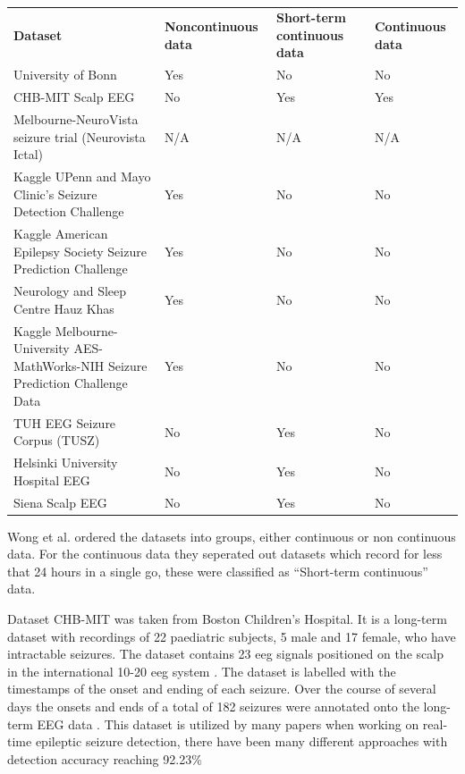 \documentclass[12pt]{article}
\begin{document}
\begin{table}[H]
\centering
\begin{tabular}{p{}p{}p{}p{}}
  \textbf{Dataset} &
  \textbf{Noncontinuous data} &
  \textbf{Short-term continuous data} &
  \textbf{Continuous data} \\
  
University of Bonn                                                              & Yes & No  & No  \\
CHB-MIT Scalp EEG                                                               & No  & Yes & Yes \\
Melbourne-NeuroVista seizure trial (Neurovista Ictal)                           & N/A & N/A & N/A \\
Kaggle UPenn and Mayo Clinic's Seizure Detection Challenge                      & Yes & No  & No  \\
Kaggle American Epilepsy Society Seizure Prediction Challenge                   & Yes & No  & No  \\
Neurology and Sleep Centre Hauz Khas                                            & Yes & No  & No  \\
Kaggle Melbourne-University AES-MathWorks-NIH Seizure Prediction Challenge Data & Yes & No  & No  \\
TUH EEG Seizure Corpus (TUSZ)                                                   & No  & Yes & No  \\
Helsinki University Hospital EEG                                                & No  & Yes & No  \\
Siena Scalp EEG                                                                 & No  & Yes & No 
\end{tabular}
\caption{\protect\cite{wong2023eeg}}
\end{table}

Wong et al. ordered the datasets into groups, either continuous or non continuous data. For the continuous data they seperated out datasets which record for less that 24 hours in a single go, these were classified as ``Short-term continuous'' data.



Dataset CHB-MIT \cite{shoeb2009application} \cite{PhysioNet} was taken from Boston Children's Hospital. It is a long-term dataset with recordings of 22 paediatric subjects, 5 male and 17 female, who have intractable seizures. The dataset contains 23 \acrshort{eeg} signals positioned on the scalp in the international 10-20 \acrshort{eeg} system \cite{sharbrough1991american}. The dataset is labelled with the timestamps of the onset and ending of each seizure. Over the course of several days the onsets and ends of a total of 182 seizures were annotated onto the long-term EEG data \cite{shoeb2009application} \cite{PhysioNet}. This dataset is utilized by many papers when working on real-time epileptic seizure detection, there have been many different approaches with detection accuracy reaching 92.23\% \cite{usman2017epileptic}
\end{document}
